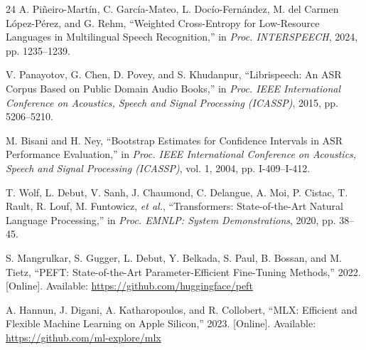 \documentclass[conference]{IEEEtran}
\begin{document}
\begin{thebibliography}{24}
A. Pi\~{n}eiro-Mart\'{i}n, C. Garc\'{i}a-Mateo, L. Doc\'{i}o-Fern\'{a}ndez,
M. del Carmen L\'{o}pez-P\'{e}rez, and G. Rehm, ``Weighted
Cross-Entropy for Low-Resource Languages in Multilingual Speech
Recognition,'' in \emph{Proc. INTERSPEECH}, 2024, pp. 1235--1239.

V. Panayotov, G. Chen, D. Povey, and S. Khudanpur, ``Librispeech: An
ASR Corpus Based on Public Domain Audio Books,'' in \emph{Proc. IEEE
International Conference on Acoustics, Speech and Signal Processing
(ICASSP)}, 2015, pp. 5206--5210.

M. Bisani and H. Ney, ``Bootstrap Estimates for Confidence Intervals in
ASR Performance Evaluation,'' in \emph{Proc. IEEE International
Conference on Acoustics, Speech and Signal Processing (ICASSP)}, vol. 1,
2004, pp. I-409--I-412.

T. Wolf, L. Debut, V. Sanh, J. Chaumond, C. Delangue, A. Moi,
P. Cistac, T. Rault, R. Louf, M. Funtowicz, \emph{et al.},
``Transformers: State-of-the-Art Natural Language Processing,'' in
\emph{Proc. EMNLP: System Demonstrations}, 2020, pp. 38--45.

S. Mangrulkar, S. Gugger, L. Debut, Y. Belkada, S. Paul, B. Bossan, and
M. Tietz, ``PEFT: State-of-the-Art Parameter-Efficient Fine-Tuning
Methods,'' 2022. [Online]. Available: \url{https://github.com/huggingface/peft}

A. Hannun, J. Digani, A. Katharopoulos, and R. Collobert, ``MLX:
Efficient and Flexible Machine Learning on Apple Silicon,'' 2023.
[Online]. Available: \url{https://github.com/ml-explore/mlx}

\end{thebibliography}
\end{document}
